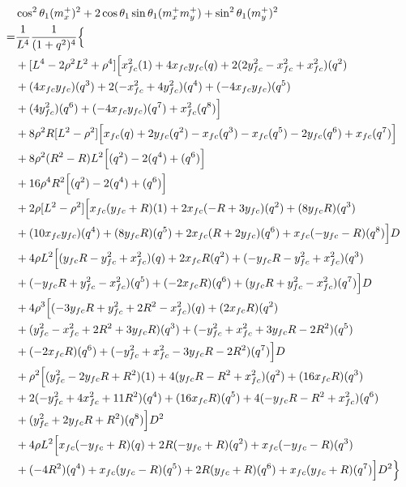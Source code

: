 \documentclass[12pt]{article}
\begin{document}
\begin{align}
    &\cos^2\theta_1(m_x^+)^2  + 2\cos\theta_1\sin\theta_1(m_x^+m_y^+)  +\sin^2\theta_1(m_y^+)^2 \\
    =& \frac{1}{L^4} \frac{1}{(1+q^2)^4} \Bigl\{ \nonumber\\
    &+ [ L^4 -2\rho^2L^2 + \rho^4 ]\Bigl[ x_{fc}^2(1) + 4x_{fc}y_{fc}(q) + 2(2y_{fc}^2 -x_{fc}^2 + x_{fc}^2)(q^2) \nonumber\\
    &+ (4x_{fc}y_{fc})(q^3) + 2(-x_{fc}^2+ 4y_{fc}^2)(q^4) + (-4x_{fc}y_{fc})(q^5) \nonumber\\
    &+ (4y_{fc}^2 )(q^6) + (- 4x_{fc}y_{fc})(q^7) +x_{fc}^2(q^8)  \Bigr] \nonumber\\
    &+  8\rho^2R[ L^2 - \rho^2 ]\Bigl[ x_{fc}(q) + 2y_{fc}(q^2) -x_{fc}(q^3) - x_{fc}(q^5) - 2y_{fc}(q^6) + x_{fc}(q^7) \Bigr] \nonumber\\
    &+ 8\rho^2(R^2-R)L^2\Bigl[ (q^2)-2(q^4)+(q^6) \Bigr] \nonumber\\
    &+ 16\rho^4R^2\Bigl[ (q^2)-2(q^4)+(q^6) \Bigr] \nonumber\\
    &+ 2\rho[ L^2 - \rho^2 ]\Bigl[ x_{fc}(y_{fc} + R)(1) + 2x_{fc}( - R + 3y_{fc} )(q^2) + (8y_{fc}R)(q^3) \nonumber\\
    &+ ( 10x_{fc}y_{fc})(q^4) + (8y_{fc}R)(q^5) + 2x_{fc}(R + 2y_{fc})(q^6) + x_{fc}(-y_{fc} -R )(q^8)   \Bigr]D \nonumber\\
    &+ 4\rho L^2\Bigl[ ( y_{fc}R -y_{fc}^2 + x_{fc}^2 )(q) + 2x_{fc}R(q^2)+  (-y_{fc}R -y_{fc}^2 + x_{fc}^2)(q^3) \nonumber\\
    &+ ( -y_{fc}R +y_{fc}^2 - x_{fc}^2 )(q^5) + (- 2x_{fc}R)(q^6)+  (y_{fc}R +y_{fc}^2 - x_{fc}^2)(q^7) \Bigr]D \nonumber\\
    &+ 4\rho^3 \Bigl[   (-3y_{fc}R + y_{fc}^2 +2R^2 -x_{fc}^2)(q)  + (2x_{fc}R)(q^2)  \nonumber\\
    &+  (y_{fc}^2 -x_{fc}^2 + 2R^2 + 3y_{fc}R)(q^3) +(-y_{fc}^2 +x_{fc}^2 + 3y_{fc}R -2R^2)(q^5)  \nonumber\\
    &+ (-2x_{fc}R)(q^6) +(-y_{fc}^2 +x_{fc}^2 - 3y_{fc}R -2R^2)(q^7)  \Bigr]D \nonumber\\
    &+ \rho^2\Bigl[ (y_{fc}^2 -2y_{fc}R+ R^2)(1) + 4(y_{fc}R -R^2+ x_{fc}^2)(q^2) + (16x_{fc}R)(q^3)  \nonumber\\
    &+ 2(-y_{fc}^2+ 4x_{fc}^2 + 11R^2)(q^4) + (16x_{fc}R)(q^5) +  4(-y_{fc}R-R^2 + x_{fc}^2)(q^6)   \nonumber\\
    &+ (y_{fc}^2+2y_{fc}R +R^2)(q^8) \Bigr]D^2 \nonumber\\
    &+ 4\rho L^2\Bigl[ x_{fc}(-y_{fc} + R)(q) + 2R(-y_{fc} + R)(q^2) + x_{fc}(-y_{fc} -R)(q^3)  \nonumber\\
    &+ ( -4R^2)(q^4) + x_{fc}(y_{fc} -R)(q^5) + 2R(y_{fc}  +R)(q^6) + x_{fc}(y_{fc} + R)(q^7) \Bigr]D^2 \Bigr\}
\end{align}
\end{document}
